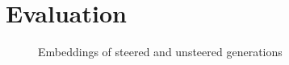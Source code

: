 \chapter{Evaluation}
\label{sec:evaluation}

\begin{figure}
  \begin{center}
    
    \caption{Embeddings of steered and unsteered generations}
  \end{center}
\end{figure}